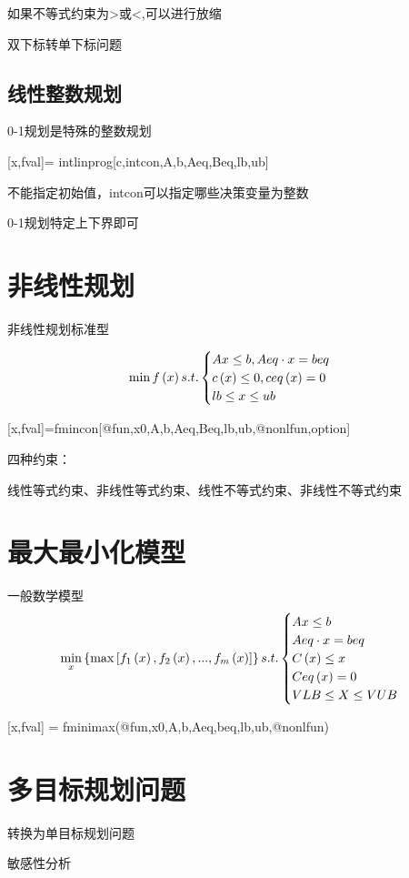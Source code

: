 \documentclass{article}
\begin{document}
如果不等式约束为>或<,可以进行放缩

双下标转单下标问题

\subsection{线性整数规划}
0-1规划是特殊的整数规划

[x,fval]= intlinprog[c,intcon,A,b,Aeq,Beq,lb,ub]

不能指定初始值，intcon可以指定哪些决策变量为整数

0-1规划特定上下界即可

\section{非线性规划}
非线性规划标准型

$$
\min  f\left( x \right) 
\\
s.t.\begin{cases}
	Ax\leq b, Aeq\cdot x=beq\\
	c\left( x \right) \leq 0, ceq\left( x \right) =0\\
	lb\leq x\leq ub\\
\end{cases}
$$

[x,fval]=fmincon[@fun,x0,A,b,Aeq,Beq,lb,ub,@nonlfun,option]

四种约束：

线性等式约束、非线性等式约束、线性不等式约束、非线性不等式约束

\section{最大最小化模型}

一般数学模型
$$
\underset{x}{\min}\left\{ \max \left[ f_1\left( x \right) ,f_2\left( x \right) ,...,f_m\left( x \right) \right] \right\} 
\\
s.t.\begin{cases}
	Ax\leq b\\
	Aeq\cdot x=beq\\
	C\left( x \right) \leq x\\
	Ceq\left( x \right) =0\\
	VLB\leq X\leq VUB\\
\end{cases}
$$

[x,fval] = fminimax(@fun,x0,A,b,Aeq,beq,lb,ub,@nonlfun)

\section{多目标规划问题}

转换为单目标规划问题

敏感性分析
\end{document}
